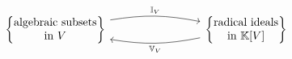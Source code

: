 \documentclass[12pt]{amsart}
\begin{document}


\section{}
\begin{definition}
\end{definition}
\begin{lemma}
\end{lemma}
\begin{remark}
\end{remark}
\begin{theorem}
\end{theorem}
\begin{lemmact}
\end{lemmact}


\[
\begin{tikzcd}[row sep = .5 em, column sep = 8em]
\left\{ \begin{matrix} 
\text{algebraic subsets} \\
\text{in $V$}
\end{matrix} \right\} \arrow[r, bend left=10, "\I_V"] & \arrow[l,bend left=10,"\V_V"]
\left\{ \begin{matrix} 
\text{radical ideals} \\
\text{in $\K[V]$}
\end{matrix} \right\} 
\end{tikzcd}
\]
\begin{proposition}
\end{proposition}

\begin{corollary}
\end{corollary}
\end{document}
